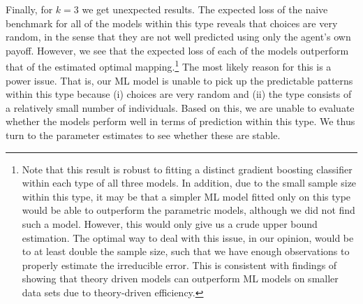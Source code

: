 \documentclass[11pt,a4paper]{article}
\theoremstyle{definition}
\begin{document}
Finally, for $k=3$ we get unexpected results. The expected loss of the naive benchmark for all of the models within this type reveals that choices are very random, in the sense that they are not well predicted using only the agent's own payoff. However, we see that the expected loss of each of the models outperform that of the estimated optimal mapping.\footnote{Note that this result is robust to fitting a distinct gradient boosting classifier within each type of all three models. In addition, due to the small sample size within this type, it may be that a simpler ML model fitted only on this type would be able to outperform the parametric models, although we did not find such a model. However, this would only give us a crude upper bound estimation. The optimal way to deal with this issue, in our opinion, would be to at least double the sample size, such that we have enough observations to properly estimate the irreducible error. This is consistent with findings of \cite{Peterson2021} showing that theory driven models can outperform ML models on smaller data sets due to theory-driven efficiency.} The most likely reason for this is a power issue. That is, our ML model is unable to pick up the predictable patterns within this type because (i) choices are very random and (ii) the type consists of a relatively small number of individuals. Based on this, we are unable to evaluate whether the models perform well in terms of prediction within this type. We thus turn to the parameter estimates to see whether these are stable.
\end{document}
